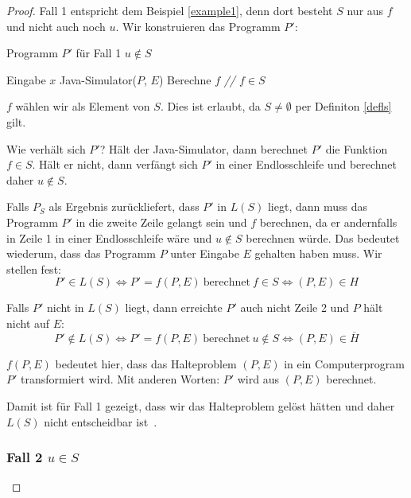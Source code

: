 \documentclass[journal]{IEEEtran}
\begin{document}
\begin{proof}
Fall 1 entspricht dem Beispiel \ref{example1}, denn dort besteht $S$ nur aus $f$ und nicht auch noch $u$. Wir konstruieren das Programm $P'$:

\begin{algorithm}
\caption{Programm $P'$ für Fall 1 $u \notin S$}
\begin{algorithmic}[1]
\renewcommand{\algorithmicrequire}{\textbf{Input:}}
\renewcommand{\algorithmicensure}{\textbf{Output:}}
\REQUIRE Eingabe $x$
\STATE Java-Simulator($P$, $E$)
\STATE Berechne $f$ \textit{// $f \in S$}
\end{algorithmic}
\end{algorithm}

$f$ wählen wir als Element von $S$. Dies ist erlaubt, da $S \ne \emptyset$ per Definiton \ref{defls} gilt.

Wie verhält sich $P'$? Hält der Java-Simulator, dann berechnet $P'$ die Funktion $f \in S$. Hält er nicht, dann verfängt sich $P'$ in einer Endlosschleife und berechnet daher $u \notin S$.

Falls $P_S$ als Ergebnis zurückliefert, dass $P'$ in $L(S)$ liegt, dann muss das Programm $P'$ in die zweite Zeile gelangt sein und $f$ berechnen, da er andernfalls in Zeile 1 in einer Endlosschleife wäre und $u \notin S$ berechnen würde. Das bedeutet wiederum, dass das Programm $P$ unter Eingabe $E$ gehalten haben muss. Wir stellen fest:
\begin{equation*}
P' \in L(S) \Leftrightarrow P' = f(P, E) \ \text{berechnet} \ f \in S \Leftrightarrow (P, E) \in H
\end{equation*}

Falls $P'$ nicht in $L(S)$ liegt, dann erreichte $P'$ auch nicht Zeile 2 und $P$ hält nicht auf $E$:
\begin{equation*}
P' \notin L(S) \Leftrightarrow P' = f(P, E) \ \text{berechnet} \ u \notin S \Leftrightarrow (P, E) \in \overline{H}
\end{equation*}

$f(P, E)$ bedeutet hier, dass das Halteproblem $(P, E)$ in ein Computerprogram $P'$ transformiert wird. Mit anderen Worten: $P'$ wird aus $(P, E)$ berechnet.

Damit ist für Fall 1 gezeigt, dass wir das Halteproblem gelöst hätten und daher $L(S)$ nicht entscheidbar ist~\cite{satzvonricebeweis}.

\subsubsection{Fall 2 $u \in S$}


\end{proof}
\end{document}
